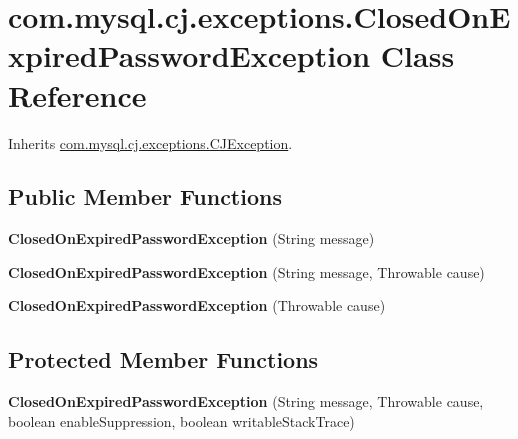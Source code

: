 \hypertarget{classcom_1_1mysql_1_1cj_1_1exceptions_1_1_closed_on_expired_password_exception}{}\section{com.\+mysql.\+cj.\+exceptions.\+Closed\+On\+Expired\+Password\+Exception Class Reference}
\label{classcom_1_1mysql_1_1cj_1_1exceptions_1_1_closed_on_expired_password_exception}


Inherits \mbox{\hyperlink{classcom_1_1mysql_1_1cj_1_1exceptions_1_1_c_j_exception}{com.\+mysql.\+cj.\+exceptions.\+C\+J\+Exception}}.

\subsection*{Public Member Functions}
\begin{DoxyCompactItemize}
\item 
\mbox{\label{classcom_1_1mysql_1_1cj_1_1exceptions_1_1_closed_on_expired_password_exception_ade81935a3553590a8ea5d0db213ef7fe}} 
{\bfseries Closed\+On\+Expired\+Password\+Exception} (String message)
\item 
\mbox{\label{classcom_1_1mysql_1_1cj_1_1exceptions_1_1_closed_on_expired_password_exception_a5707cafa7b5502424ccc4e69c5508640}} 
{\bfseries Closed\+On\+Expired\+Password\+Exception} (String message, Throwable cause)
\item 
\mbox{\label{classcom_1_1mysql_1_1cj_1_1exceptions_1_1_closed_on_expired_password_exception_a92563017b79ff810501ab63aa1357035}} 
{\bfseries Closed\+On\+Expired\+Password\+Exception} (Throwable cause)
\end{DoxyCompactItemize}
\subsection*{Protected Member Functions}
\begin{DoxyCompactItemize}
\item 
\mbox{\label{classcom_1_1mysql_1_1cj_1_1exceptions_1_1_closed_on_expired_password_exception_ad6869873ce2abecf34755acfaf6bb19f}} 
{\bfseries Closed\+On\+Expired\+Password\+Exception} (String message, Throwable cause, boolean enable\+Suppression, boolean writable\+Stack\+Trace)
\end{DoxyCompactItemize}
